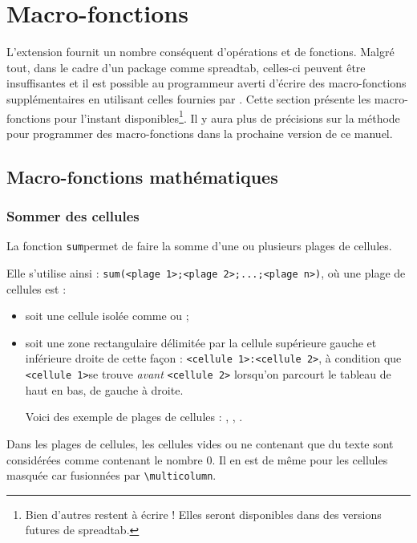 \documentclass[a4paper,10pt]{article}
\newcommand\verbinline[1][]{\lstinline[breaklines=false,basicstyle=\normalsize\ttfamily,#1]}
\newcommand\ST{\textsf{spreadtab}\xspace}
\newcommand\falseverb[1]{\texttt{\detokenize{#1}}}
\begin{document}
\section{Macro-fonctions}
L'extension \falseverb{fp} fournit un nombre conséquent d'opérations et de fonctions. Malgré tout, dans le cadre d'un package comme \ST, celles-ci peuvent être insuffisantes et il est possible au programmeur averti d'écrire des macro-fonctions supplémentaires en utilisant celles fournies par \falseverb{fp}. Cette section présente les macro-fonctions pour l'instant disponibles\footnote{Bien d'autres restent à écrire ! Elles seront disponibles dans des versions futures de \ST.}. Il y aura plus de précisions sur la méthode pour programmer des macro-fonctions dans la prochaine version de ce manuel.

\subsection{Macro-fonctions mathématiques}
\subsubsection{Sommer des cellules}
La fonction \og\verbinline=sum=\fg permet de faire la somme d'une ou plusieurs plages de cellules.

Elle s'utilise ainsi : \verbinline=sum(<plage 1>;<plage 2>;...;<plage n>)=, où une plage de cellules est :
\begin{itemize}
	\item soit une cellule isolée comme \og\falseverb{a1}\fg{} ou \og\falseverb{[2,1]}\fg{};
	\item soit une zone rectangulaire délimitée par la cellule supérieure gauche et inférieure droite de cette façon : \og\verb=<cellule 1>:<cellule 2>=\fg, à condition que \og\verb=<cellule 1>=\fg se trouve \emph{avant} \og\verb=<cellule 2>=\fg{} lorsqu'on parcourt le tableau de haut en bas, de gauche à droite.\par
	Voici des exemple de plages de cellules : \og\falseverb{a2:d5}\fg{}, \og\falseverb{[-1,-1]:[2,3]}\fg{}, \og\falseverb{b4:[5,1]}\fg{}.
\end{itemize}
Dans les plages de cellules, les cellules vides ou ne contenant que du texte sont considérées comme contenant le nombre 0. Il en est de même pour les cellules masquée car fusionnées par \verbinline-\multicolumn-.
\end{document}
